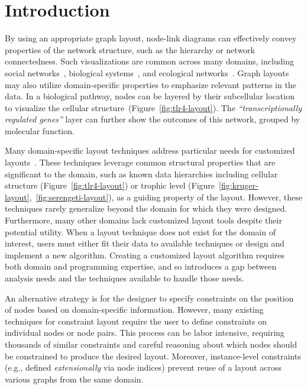 \section{Introduction}
By using an appropriate graph layout, node-link diagrams can effectively 
convey properties of the network structure, such as the hierarchy or network connectedness. 
Such visualizations are common across many domains, including 
social networks~\cite{scott1988social,rothenberg1998using,fitzpatrick2001preventable,mcelroy2003network,fu2011hiv},
biological systems~\cite{becker2001graph,shannon2003cytoscape,saraiya2005visualizing,li2005grid,kojima2007efficient,barsky2008cerebral,gehlenborg2010visualization},
and ecological networks~\cite{lavigne1996cod,yodzis1998local,cohen2003ecological,hinke2004visualizing,harper2006dynamic,baskerville2011spatial,kearney2016blog,benson2016higher,kruger2017}. 
Graph layouts may also utilize domain-specific properties 
to emphasize relevant patterns in the data.
In a biological pathway, nodes can be layered by their
subcellular location to visualize the cellular structure~(Figure~\ref{fig:tlr4-layout}). 
The \emph{``transcriptionally regulated genes''} layer can
further show the outcomes of this network, grouped by molecular function.

\tlrfourLayout

Many domain-specific layout techniques address particular needs
for customized layouts~\cite{genc2003constrained,shannon2003cytoscape,barsky2008cerebral,kearney2017d3,kearney2017ecopath}. These
techniques leverage common structural properties that are significant to the
domain, such as known data hierarchies including cellular 
structure (Figure~\ref{fig:tlr4-layout}) or trophic level
(Figure~\ref{fig:kruger-layout},~\ref{fig:serengeti-layout}), as a guiding property of the
layout. However, these techniques rarely generalize beyond the domain for
which they were designed. Furthermore, many
other domains lack customized layout tools despite their potential utility.
When a layout technique does not exist for the
domain of interest, users must either fit their data
to available techniques or design and implement a new algorithm.
Creating a customized layout algorithm requires both
domain and programming expertise, and so introduces a gap between 
analysis needs and the techniques available to handle those needs.

An alternative strategy is for the designer to specify constraints on the 
position of nodes based on domain-specific information. However, many existing 
techniques for constraint layout require the user to define constraints
on individual nodes or node pairs. This process can be labor
intensive, requiring thousands of similar constraints and careful reasoning
about which nodes should be constrained to produce the desired layout. 
Moreover, instance-level constraints 
(e.g., defined \emph{extensionally} via node indices) prevent
reuse of a layout across various graphs from the same domain.

